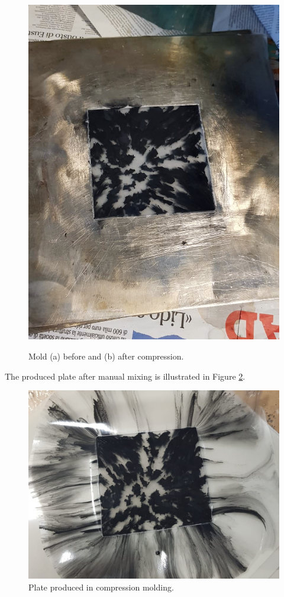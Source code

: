 \documentclass[a4paper, 11pt]{article}
\begin{document}
\begin{figure}[htp]
	{\includegraphics[scale=0.2]{PHOTO-2019-05-23-17-38-6.jpg}}
	\caption{Mold (a) before and (b) after compression.}
	\label{fig:beforeafter}
\end{figure}

The produced plate after manual mixing is illustrated in Figure \ref{fig:plate1}. 

\begin{figure}[htp]
	\centering
	\includegraphics[scale=0.2]
	{PHOTO-2019-05-23-17-38-7.jpg}
	\caption{Plate produced in compression molding.}
	\label{fig:plate1}
\end{figure}
\end{document}
